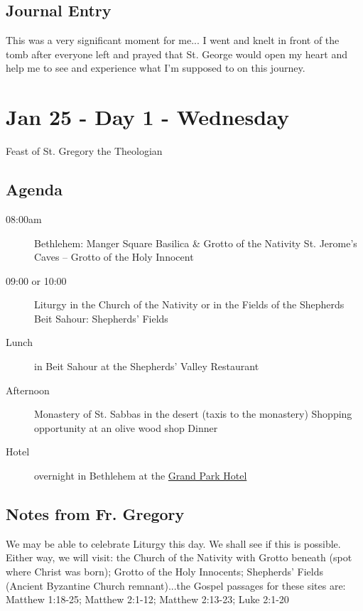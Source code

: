 \documentclass[letterpaper]{report}
\begin{document}
\subsection{Journal Entry}
This was a very significant moment for me... I went and knelt in front of the tomb after everyone left and prayed that St. George would open my heart and help me to see and experience what I'm supposed to on this journey.

\clearpage
\section{Jan 25 - Day 1 - Wednesday}
Feast of St. Gregory the Theologian

\subsection{Agenda}
\begin{description}
	\item[08:00am] Bethlehem: Manger Square
	    \subitem Basilica \& Grotto of the Nativity
	    \subitem St. Jerome's Caves – Grotto of the Holy Innocent
	\item[09:00 or 10:00] Liturgy in the Church of the Nativity or in the 
		Fields of the Shepherds
		\subitem Beit Sahour: Shepherds’ Fields
	\item[Lunch] in Beit Sahour at the Shepherds’ Valley Restaurant 
	\item[Afternoon] Monastery of St. Sabbas in the desert 
	    (taxis to the monastery)
	    \subitem Shopping opportunity at an olive wood shop Dinner 
	    
	\item[Hotel] overnight in Bethlehem at the
	  \href{http://www.grandpark.com/bethlehem/}{Grand Park Hotel}
\end{description}

\subsection{Notes from Fr. Gregory}
We may be able to celebrate Liturgy this day. We shall see if this is possible. Either way, we will visit: the Church of the Nativity with Grotto beneath (spot where Christ was born); Grotto of the Holy Innocents; Shepherds' Fields (Ancient Byzantine Church remnant)...the Gospel passages for these sites are: 
Matthew 1:18-25; Matthew 2:1-12; Matthew 2:13-23; Luke 2:1-20
\end{document}
